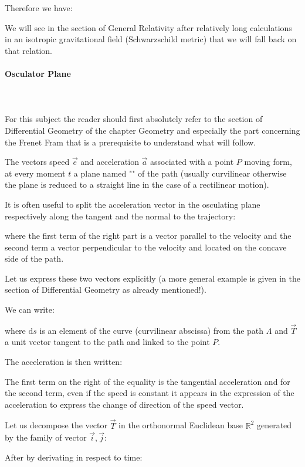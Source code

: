 	Therefore we have:
	
	We will see in the section of General Relativity after relatively long calculations in an isotropic gravitational field (Schwarzschild metric) that we will fall back on that relation.
	
	\pagebreak
	\paragraph{Osculator Plane}\mbox{}\\\\
	For this subject the reader should first absolutely refer to the section of Differential Geometry of the chapter Geometry and especially the part concerning the Frenet Fram that is a prerequisite to understand what will follow.
	
	The vectors speed $\vec{e}$ and acceleration $\vec{a}$ associated with a point $P$ moving form, at every moment $t$ a plane named "" of the path (usually curvilinear otherwise the plane is reduced to a straight line in the case of a rectilinear motion).

	It is often useful to split the acceleration vector in the osculating plane respectively along the tangent and the normal to the trajectory:
	
	where the first term of the right part is a vector parallel to the velocity and the second term a vector perpendicular to the velocity and located on the concave side of the path.

	Let us express these two vectors explicitly (a more general example is given in the section of Differential Geometry as already mentioned!).

	We can write:
	
	where $\mathrm{d}s$ is an element of the curve (curvilinear abscissa) from the path $\Lambda$ and $\vec{T}$ a unit vector tangent to the path and linked to the point $P$.
	
	The acceleration is then written:
	
	The first term on the right of the equality is the tangential acceleration and for the second term, even if the speed is constant it appears in the expression of the acceleration to express the change of direction of the speed vector.
	
	Let us decompose the vector $\vec{T}$ in the orthonormal Euclidean base $\mathbb{R}^2$ generated by the family of vector $\vec{i},\vec{j}$:
	
	After by derivating in respect to time:
	
